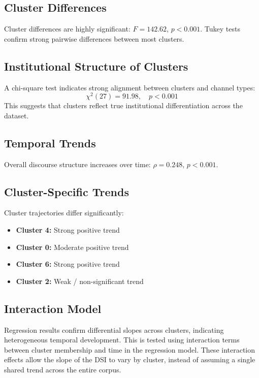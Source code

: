 \documentclass[11pt]{article}
\begin{document}
\subsection{Cluster Differences}
Cluster differences are highly significant: $F = 142.62$, $p < 0.001$. Tukey tests confirm strong pairwise differences between most clusters.

\subsection{Institutional Structure of Clusters}
A chi-square test indicates strong alignment between clusters and channel types:
\begin{equation}
    \chi^2(27) = 91.98, \quad p < 0.001
\end{equation}
This suggests that clusters reflect true institutional differentiation across the dataset.

\subsection{Temporal Trends}
Overall discourse structure increases over time: $\rho = 0.248$, $p < 0.001$.

\subsection{Cluster-Specific Trends}
Cluster trajectories differ significantly:
\begin{itemize}
    \item \textbf{Cluster 4:} Strong positive trend
    \item \textbf{Cluster 0:} Moderate positive trend
    \item \textbf{Cluster 6:} Strong positive trend
    \item \textbf{Cluster 2:} Weak / non-significant trend
\end{itemize}

\subsection{Interaction Model}
Regression results confirm differential slopes across clusters, indicating heterogeneous temporal development. This is tested using interaction terms between cluster membership and time in the regression model. These interaction effects allow the slope of the DSI to vary by cluster, instead of assuming a single shared trend across the entire corpus. 
\end{document}

